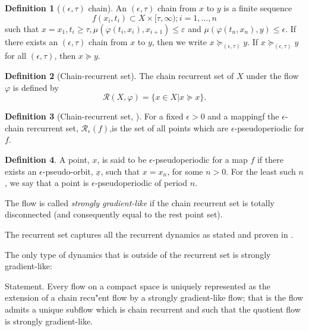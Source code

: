 \documentclass{scrartcl}
\theoremstyle{definition}
\newtheorem{definition}{Definition}
\theoremstyle{remark}
\begin{document}
\begin{definition}[$(\epsilon,\tau)$ chain]
An $(\epsilon,\tau)$ chain from $x$ to $y$ is a finite sequence 
\[f(x_i, t_i) \subset  X \times  [\tau,\infty); i = 1, \dots, n\]
such that $x = x_1, t_i\geq \tau, \mu(\varphi(t_i, x_i), x_{i+1})\leq \varepsilon$   and $\mu(\varphi(t_n, x_n), y)\leq \epsilon$.
 If there exists an $(\epsilon,\tau)$ chain from $x$ to $y$, then we write $x \succeq_{(\epsilon,\tau)}y$. If  $x \succeq_{(\epsilon,\tau)}y$ for all $(\epsilon,\tau)$, then  $x \succeq y$.
\end{definition}


\begin{definition}[Chain-recurrent set]
The chain recurrent set of $X$ under the flow $\varphi$ is defined by 
\[\mathcal{R}(X,\varphi) = \{x\in X|x\succeq x\}.\]
\end{definition}

\begin{definition}[Chain-recurrent set, \citep{casey1996}]
For a fixed $\epsilon > 0$ and a mappingf the $\epsilon$-chain rercurrent set, $\mathcal{R}_\epsilon(f)$,is the set of all points which are $\epsilon$-pseudoperiodic for $f$.
\end{definition}

\begin{definition}
A point, $x$, is said to be  $\epsilon$-pseudoperiodic for a map $f$ if there exists an $\epsilon$-pseudo-orbit, $\underline{x}$, such that $x = x_n$, for some $n > 0$.
 For the least such $n$, we say that a point is $\epsilon$-pseudoperiodic of period $n$.
\end{definition}


The flow is called \emph{strongly gradient-like} if the chain recurrent set is totally disconnected (and consequently equal to the rest point set). 

The recurrent set captures all the recurrent dynamics as stated and proven in \citep[Chapter I.8.2]{conley1978}.

The only type of dynamics that is outside of the recurrent set is strongly gradient-like:

Statement. Every flow on a compact space is uniquely represented as the extension of a chain recu"ent flow by a strongly gradient-like flow; that is the flow admits a unique subflow which is chain recurrent and such that the quotient flow is strongly gradient-like.
\end{document}
